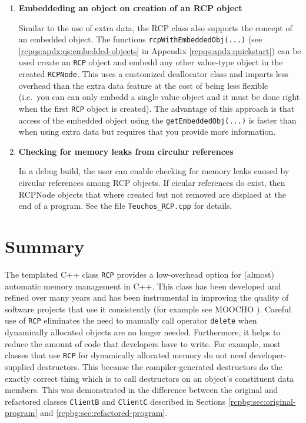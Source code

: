\documentclass[pdf,ps2pdf,11pt]{SANDreport}
\begin{document}
\begin{enumerate}
\item \textbf{Embeddeding an object on creation of an RCP object}

Similar to the use of extra data, the RCP class also supports the concept of
an embedded object.  The functions
{}\texttt{rcp\-With\-Embedded\-Obj(...)} (see
{}\ref{rcpqs:apdx:qs:embedded-objects} in Appendix
{}\ref{rcpqs:apdx:quickstart}) can be used create an {}\texttt{RCP} object and
embedd any other value-type object in the created {}\texttt{RCPNode}.  This
uses a customized deallocator class and imparts less overhead than the extra
data feature at the cost of being less flexible (i.e.\ you can can only embedd
a single value object and it must be done right when the first {}\texttt{RCP}
object is created).  The advantage of this approach is that access of the
embedded object using the {}\texttt{get\-[Nonconst]\-Embedded\-Obj(...)} is
faster than when using extra data but requires that you provide more
information.

\item \textbf{Checking for memory leaks from circular references}

In a debug build, the user can enable checking for memory leaks caused by
circular references among RCP objects.  If cicular references do exist, then
RCPNode objects that where created but not removed are displaed at the end of
a program.  See the file {}\texttt{Teuchos\-\_RCP.cpp} for details.

\end{enumerate}

%
\section{Summary}
%

The templated C++ class {}\texttt{RCP} provides a
low-overhead option for (almost) automatic memory management in C++.
This class has been developed and refined over many years and has been
instrumental in improving the quality of software projects that use it
consistently (for example see MOOCHO {}\cite{ref:moochouserguide}).
Careful use of {}\texttt{RCP} eliminates the need to
manually call operator {}\texttt{delete} when dynamically allocated
objects are no longer needed.  Furthermore, it helps to reduce the
amount of code that developers have to write.  For example, most
classes that use {}\texttt{RCP} for dynamically
allocated memory do not need developer-supplied destructors.  This
because the compiler-generated destructors do the exactly correct
thing which is to call destructors on an object's constituent data
members.  This was demonstrated in the difference between the original
and refactored classes {}\texttt{ClientB} and {}\texttt{ClientC}
described in Sections {}\ref{rcpbg:sec:original-program} and
{}\ref{rcpbg:sec:refactored-program}.
\end{document}
